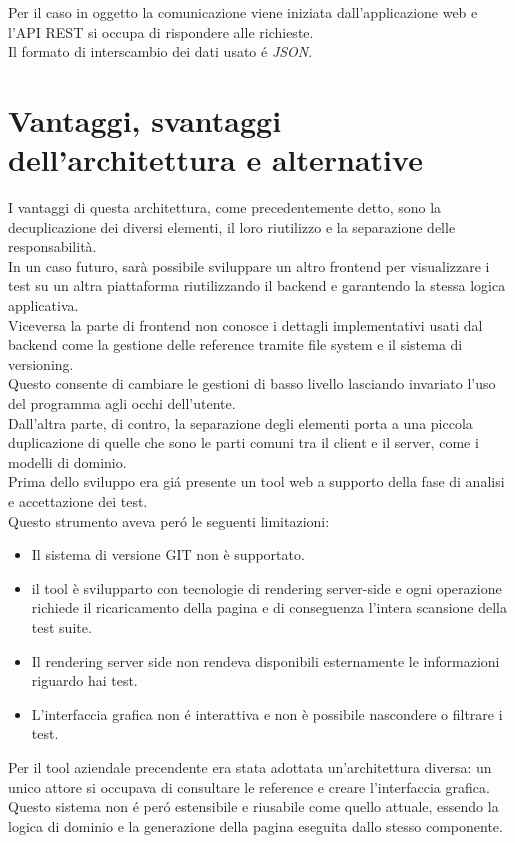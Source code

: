         Per il caso in oggetto la comunicazione viene iniziata dall'applicazione web e l'API REST si occupa di rispondere alle richieste.\\
        Il formato di interscambio dei dati usato \'e \textit{JSON}.

    \section{Vantaggi, svantaggi dell'architettura e alternative}
        I vantaggi di questa architettura, come precedentemente detto, sono la decuplicazione dei diversi elementi, il loro riutilizzo e la separazione delle responsabilità.\\
        
        In un caso futuro, sarà possibile sviluppare un altro frontend per visualizzare i test su un altra piattaforma riutilizzando il backend e garantendo la stessa logica applicativa.\\
        Viceversa la parte di frontend non conosce i dettagli implementativi usati dal backend come la gestione delle reference tramite file system e il sistema di versioning.\\
        Questo consente di cambiare le gestioni di basso livello lasciando invariato l'uso del programma agli occhi dell'utente.\\  
        
        Dall'altra parte, di contro, la separazione degli elementi porta a una piccola duplicazione di quelle che sono le parti comuni tra il client e il server, come i modelli di dominio.\\

        Prima dello sviluppo era gi\'a presente un tool web a supporto della fase di analisi e accettazione dei test.\\
        Questo strumento aveva per\'o le seguenti limitazioni:\\
            \begin{itemize}
                \item Il sistema di versione GIT non è supportato.
                \item il tool è svilupparto con tecnologie di rendering server-side e ogni operazione richiede il ricaricamento della pagina e di conseguenza l'intera scansione della test suite.
                \item Il rendering server side non rendeva disponibili esternamente le informazioni riguardo hai test.
                \item L'interfaccia grafica non \'e interattiva e non è possibile nascondere o filtrare i test.
            \end{itemize}

        Per il tool aziendale precendente era stata adottata un'architettura diversa: un unico attore si occupava di consultare le reference e creare l'interfaccia grafica. \\
        Questo sistema non \'e per\'o estensibile e riusabile come quello attuale, essendo la logica di dominio e la generazione della pagina eseguita dallo stesso componente.
